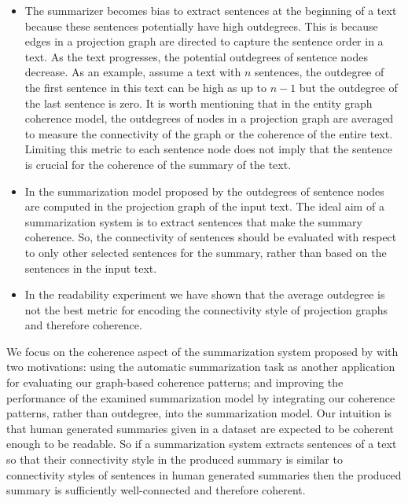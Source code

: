 \begin{itemize}
	\item 
	The summarizer becomes bias to extract sentences at the beginning of a text because these sentences potentially have high outdegrees. 
	This is because edges in a projection graph are directed to capture the sentence order in a text.
	As the text progresses, the potential outdegrees of sentence nodes decrease. 
	As an example, assume a text with $n$ sentences, the outdegree of the first sentence in this text can be high as up to $n-1$ but the outdegree of the last sentence is zero. 
	It is worth mentioning that in the entity graph coherence model, the outdegrees of nodes in a projection graph are averaged to measure the connectivity of the graph or the coherence of the entire text.  
	Limiting this metric to each sentence node does not imply that the sentence is crucial for the coherence of the summary of the text.   
	
	\item 
	In the summarization model proposed by   the outdegrees of sentence nodes are computed in the projection graph of the input text.   
	The ideal aim of a summarization system is to extract sentences that make the summary coherence. 
	So, the connectivity of sentences should be evaluated with respect to only other selected sentences for the summary, rather than based on the sentences in the input text. 


	\item In the readability experiment we have shown that the average outdegree is not the best metric for encoding the connectivity style of projection graphs and therefore coherence. 
	
\end{itemize} 

We focus on the coherence aspect of the summarization system proposed by  with two motivations: using the automatic summarization task as another application for evaluating our graph-based coherence patterns; and improving the performance of the examined summarization  model by integrating our coherence patterns, rather than outdegree, into the summarization model. 
Our intuition is that human generated summaries given in a dataset are expected to be coherent enough to be readable.
So if a summarization system extracts sentences of a text so that their connectivity style in the produced summary is similar to connectivity styles of sentences in human generated summaries then the produced summary is sufficiently well-connected and therefore coherent. 
 
